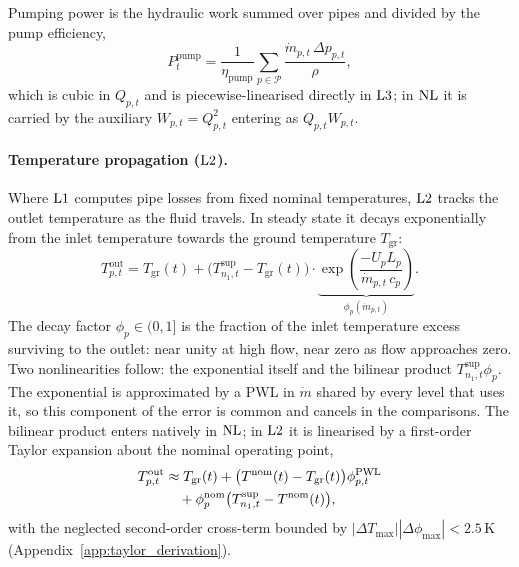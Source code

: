 Pumping power is the hydraulic work summed over pipes and divided by the pump efficiency,
%
\begin{equation}
  P_t^{\mathrm{pump}} = \frac{1}{\eta_{\mathrm{pump}}}
    \sum_{p \in \mathcal{P}}
    \frac{\dot{m}_{p,t}\, \Delta p_{p,t}}{\rho},
  \label{eq:pump_power}
\end{equation}
%
which is cubic in $Q_{p,t}$ and is piecewise-linearised directly in $\mathrm{L3}$; in $\mathrm{NL}$
it is carried by the auxiliary $W_{p,t} = Q_{p,t}^2$ entering as $Q_{p,t} W_{p,t}$.

\paragraph{Temperature propagation ($\mathrm{L2}$).}
Where $\mathrm{L1}$ computes pipe losses from fixed nominal temperatures, $\mathrm{L2}$ tracks the
outlet temperature as the fluid travels. In steady state it decays exponentially from the
inlet temperature towards the ground temperature $T_{\mathrm{gr}}$:
%
\begin{equation}
  T_{p,t}^{\mathrm{out}} = T_{\mathrm{gr}}(t)
    + \bigl(T_{n_1,t}^{\mathrm{sup}} - T_{\mathrm{gr}}(t)\bigr)
    \cdot \underbrace{\exp\!\left(
      \frac{-U_p L_p}{\dot{m}_{p,t}\, c_p}
    \right)}_{\displaystyle\phi_p(\dot{m}_{p,t})}.
  \label{eq:temp_prop}
\end{equation}
%
The decay factor $\phi_p \in (0,1]$ is the fraction of the inlet temperature excess
surviving to the outlet: near unity at high flow, near zero as flow approaches zero. Two
nonlinearities follow: the exponential itself and the bilinear product
$T_{n_1,t}^{\mathrm{sup}} \phi_p$. The exponential is approximated by a PWL in $\dot{m}$
shared by every level that uses it, so this component of the error is common and cancels in
the comparisons. The bilinear product enters natively in $\mathrm{NL}$; in $\mathrm{L2}$ it is
linearised by a first-order Taylor expansion about the nominal operating point,
%
\begin{align}
  T_{p,t}^{\mathrm{out}} &\approx T_{\mathrm{gr}}(t)
    + \bigl(T^{\mathrm{nom}}(t) - T_{\mathrm{gr}}(t)\bigr)
      \phi_{p,t}^{\mathrm{PWL}} \notag \\
    &\quad + \phi_p^{\mathrm{nom}}
      \bigl(T_{n_1,t}^{\mathrm{sup}} - T^{\mathrm{nom}}(t)\bigr),
  \label{eq:temp_prop_lin}
\end{align}
%
with the neglected second-order cross-term bounded by
$|\Delta T_{\max}||\Delta\phi_{\max}| < 2.5$\,K (Appendix~\ref{app:taylor_derivation}).


